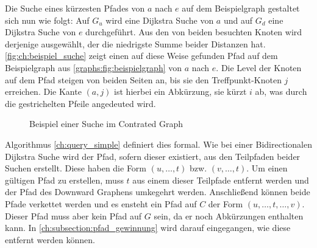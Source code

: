 Die Suche eines kürzesten Pfades von $a$ nach $e$ auf dem Beispielgraph gestaltet sich nun wie folgt:
Auf $G_u$ wird eine Dijkstra Suche von $a$ und auf $G_d$ eine Dijkstra Suche von $e$ durchgeführt.
Aus den von beiden besuchten Knoten wird derjenige ausgewählt, der die niedrigste Summe beider Distanzen hat.
\autoref{fig:ch:beispiel_suche} zeigt einen auf diese Weise gefunden Pfad auf dem Beispielgraph aus \autoref{graphs:fig:beispielgraph} von $a$ nach $e$.
Die Level der Knoten auf dem Pfad steigen von beiden Seiten an, bis sie den Treffpunkt-Knoten $j$ erreichen.
Die Kante $(a, j)$ ist hierbei ein Abkürzung, sie kürzt $i$ ab, was durch die gestrichelten Pfeile angedeuted wird.

\begin{figure}[ht]
    \centering
    \caption{Beispiel einer Suche im Contrated Graph}
    \label{fig:ch:beispiel_suche}
\end{figure}

Algorithmus \ref{ch:query_simple} definiert dies formal.
Wie bei einer Bidirectionalen Dijkstra Suche wird der Pfad, sofern dieser existiert, aus den Teilpfaden beider Suchen erstellt.
Diese haben die Form $(u, \dotsc, t)$ bzw. $(v, \dotsc, t)$.
Um einen gültigen Pfad zu erstellen, muss $t$ aus einem dieser Teilpfade entfernt werden und der Pfad des Downward Graphens umkegehrt werden.
Anschließend können beide Pfade verkettet werden und es ensteht ein Pfad auf $C$ der Form $(u, \dotsc, t, \dotsc, v)$.
Dieser Pfad muss aber kein Pfad auf $G$ sein, da er noch Abkürzungen enthalten kann.
In \autoref{ch:subsection:pfad_gewinnung} wird darauf eingegangen, wie diese entfernt werden können.

